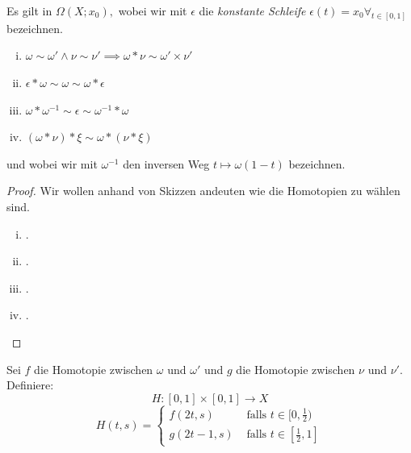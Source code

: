 \documentclass[a4paper,10pt]{scrartcl}
\begin{document}
\begin{lem}  \label{thm:2.1.5}
 Es gilt in $\Omega(X;x_0),$ wobei wir mit $\epsilon$ die \emph{konstante Schleife} 
$\epsilon(t)=x_0 \forall_{t\in [0,1]}$ bezeichnen.
\begin{enumerate}[(i)]
 \item $\omega \sim \omega' \land \nu \sim \nu' \implies \omega *\nu \sim \omega'\times \nu'$
  \item $\epsilon * \omega \sim \omega \sim \omega* \epsilon$ 
\item $\omega * \omega^{-1} \sim \epsilon \sim \omega^{-1}*\omega$
 \item $(\omega * \nu)*\xi \sim \omega*(\nu * \xi)$
\end{enumerate}
und wobei wir mit $\omega^{-1}$ den inversen Weg $t\mapsto \omega(1-t)$ bezeichnen.
\end{lem}
\begin{proof}
Wir wollen anhand von Skizzen andeuten wie die Homotopien zu wählen sind.
\begin{enumerate}[(i)]
\item .
\begin{figure}[H]
\centering

\caption{}
\end{figure}
\item .
\begin{figure}[H]
\centering

\caption{}
\end{figure}
\item .
\begin{figure}[H]
\centering

\caption{}
\end{figure}
\item .
\begin{figure}[H]
\centering

\caption{}
\end{figure}
\end{enumerate}
\end{proof}
\begin{note*}
Sei $f$ die Homotopie zwischen $\omega$ und $\omega'$ und $g$ die Homotopie zwischen $\nu$ und $ \nu'$. Definiere:
\[
 H:[0,1]\times[0,1]\to X
\]
\[
 H(t,s)=\begin{cases} f(2t, s) &\text{ falls } t\in [0, \frac{1}{2}) \\ g(2t-1,s) &\text{ falls } t\in [\frac{1}{2}, 1] \end{cases}
\]
\end{note*}
\end{document}
